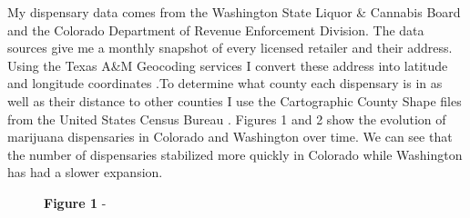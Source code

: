 \documentclass[11pt]{article}
\begin{document}
My dispensary data comes from the Washington State Liquor \& Cannabis Board and the Colorado Department of Revenue Enforcement Division. The data sources give me a monthly snapshot of every licensed retailer and their address. Using the Texas A\&M Geocoding services I convert these address into latitude and longitude coordinates \cite{tamu}.To determine what county each dispensary is in as well as their distance to other counties I use the Cartographic County Shape files from the United States Census Bureau \cite{branch_2018}. Figures 1 and 2 show the evolution of marijuana dispensaries in Colorado and Washington over time. We can see that the number of dispensaries stabilized more quickly in Colorado while Washington has had a slower expansion. \par


\begin{figure}[H]
	\centering
		\LARGE{\textbf{Figure 1}}
\newline
-
\end{figure}
\end{document}
